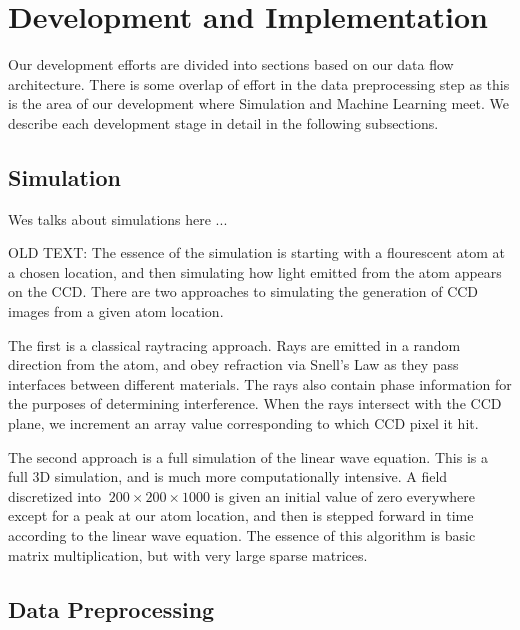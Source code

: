 \section{Development and Implementation}
\label{development}

Our development efforts are divided into sections based on our data flow architecture.  There is some overlap of effort in the data preprocessing step as this is the area of our development where Simulation and Machine Learning meet.  We describe each development stage in detail in the following subsections.

\subsection{Simulation}

Wes talks about simulations here ...

OLD TEXT:
The essence of the simulation is starting with a flourescent atom at a chosen location, and then simulating how light emitted from the atom appears on the CCD. There are two approaches to simulating the generation of CCD images from a given atom location.

The first is a classical raytracing approach. Rays are emitted in a random direction from the atom, and obey refraction via Snell's Law as they pass interfaces between different materials. The rays also contain phase information for the purposes of determining interference. When the rays intersect with the CCD plane, we increment an array value corresponding to which CCD pixel it hit.

The second approach is a full simulation of the linear wave equation. This is a full 3D simulation, and is much more computationally intensive. A field discretized into $~200\times 200\times 1000$ is given an initial value of zero everywhere except for a peak at our atom location, and then is stepped forward in time according to the linear wave equation. The essence of this algorithm is basic matrix multiplication, but with very large sparse matrices.

\subsection{Data Preprocessing}

